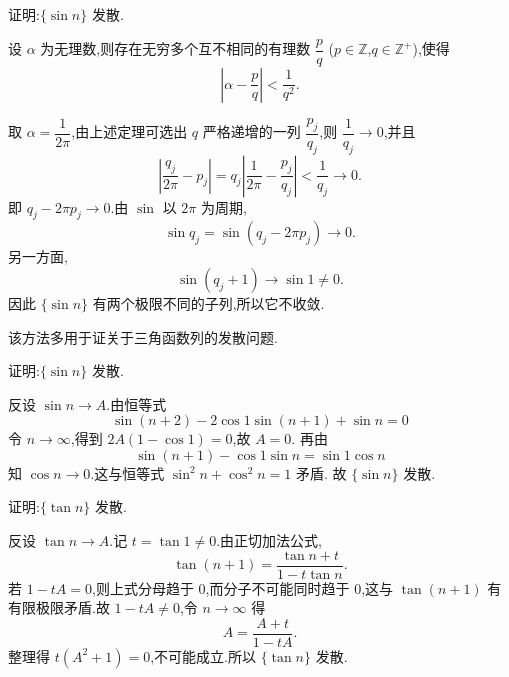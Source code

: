 \begin{example}
  证明:$\{\sin n\}$ 发散.
\end{example}
\exampleblank

\begin{solution}

  \begin{theorem*}
    设 $\alpha$ 为无理数,则存在无穷多个互不相同的有理数 $\dfrac{p}{q}$
    ($p\in\mathbb{Z}$,$q\in\mathbb{Z}^+$),使得
    \[
      \left|\alpha-\dfrac{p}{q}\right|<\dfrac{1}{q^2}.
    \]
  \end{theorem*}
  

  取 $\alpha=\dfrac{1}{2\pi}$,由上述定理可选出 $q$ 严格递增的一列
  $\dfrac{p_j}{q_j}$,则 $\dfrac{1}{q_j}\to0$,并且
  \[
    \left|\dfrac{q_j}{2\pi}-p_j\right|
    =q_j\left|\dfrac{1}{2\pi}-\dfrac{p_j}{q_j}\right|
    <\dfrac{1}{q_j}\longrightarrow0.
  \]
  即 $q_j-2\pi p_j\to0$.由 $\sin$ 以 $2\pi$ 为周期,
  \[
    \sin q_j=\sin(q_j-2\pi p_j)\longrightarrow0.
  \]
  另一方面,
  \[
    \sin(q_j+1)\longrightarrow\sin1\neq0.
  \]
  因此 $\{\sin n\}$ 有两个极限不同的子列,所以它不收敛.
\end{solution}




该方法多用于证关于三角函数列的发散问题.

\begin{example}
  证明:$\{\sin n\}$ 发散.
\end{example}
\exampleblank

\begin{solution}
  反设 $\sin n\to A$.由恒等式
  \[
    \sin(n+2)-2\cos1\sin(n+1)+\sin n=0
  \]
  令 $n\to\infty$,得到 $2A(1-\cos1)=0$,故 $A=0$.
  再由
  \[
    \sin(n+1)-\cos1\sin n=\sin1\cos n
  \]
  知 $\cos n\to0$.这与恒等式 $\sin^2n+\cos^2n=1$ 矛盾.
  故 $\{\sin n\}$ 发散.
\end{solution}

\begin{example}
  证明:$\{\tan n\}$ 发散.
\end{example}
\exampleblank

\begin{solution}
  反设 $\tan n\to A$.记 $t=\tan1\neq0$.由正切加法公式,
  \[
    \tan(n+1)=\dfrac{\tan n+t}{1-t\tan n}.
  \]
  若 $1-tA=0$,则上式分母趋于 $0$,而分子不可能同时趋于 $0$,这与
  $\tan(n+1)$ 有有限极限矛盾.故 $1-tA\neq0$,令 $n\to\infty$ 得
  \[
    A=\dfrac{A+t}{1-tA}.
  \]
  整理得 $t(A^2+1)=0$,不可能成立.所以 $\{\tan n\}$ 发散.
\end{solution}

